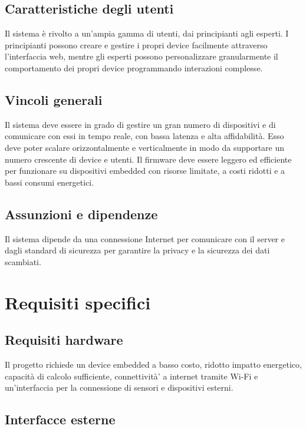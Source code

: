\subsection{Caratteristiche degli utenti}

Il sistema è rivolto a un'ampia gamma di utenti, dai principianti agli esperti. I principianti possono
creare e gestire i propri device facilmente attraverso l'interfaccia web, mentre gli esperti possono
personalizzare granularmente il comportamento dei propri device programmando interazioni complesse.

\subsection{Vincoli generali}

Il sistema deve essere in grado di gestire un gran numero di dispositivi e di comunicare con essi in tempo reale,
con bassa latenza e alta affidabilità. Esso deve poter scalare orizzontalmente e verticalmente
in modo da supportare un numero crescente di device e utenti. 
Il firmware deve essere leggero ed efficiente per funzionare su dispositivi embedded con risorse limitate,
a costi ridotti e a bassi consumi energetici.

\subsection{Assunzioni e dipendenze}

Il sistema dipende da una connessione Internet per comunicare con il server e dagli standard di sicurezza
per garantire la privacy e la sicurezza dei dati scambiati. 

\section{Requisiti specifici}

\subsection{Requisiti hardware}

Il progetto richiede un device embedded a basso costo, ridotto impatto energetico, capacità di calcolo 
sufficiente, connettività' a internet tramite Wi-Fi e un'interfaccia per la connessione di sensori e dispositivi 
esterni.

\subsection{Interfacce esterne}


